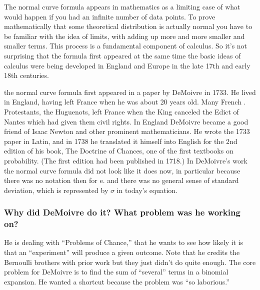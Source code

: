 \documentclass{article}
\begin{document}
The normal curve formula appears in mathematics as a limiting case of what would happen if you had an
infinite number of data points. To prove mathematically that some theoretical distribution is actually
normal you have to be familiar with the idea of limits, with adding up more and more smaller and smaller
terms. This process is a fundamental component of calculus. So it’s not surprising that the formula first
appeared at the same time the basic ideas of calculus were being developed in England and Europe in the
late 17th and early 18th centuries.

the normal curve formula first appeared in a paper by DeMoivre in 1733. He lived in
England, having left France when he was about 20 years old. Many French .
Protestants, the Huguenots, left France when the King canceled the Edict of Nantes
which had given them civil rights. In England DeMoivre became a good friend of
Isaac Newton and other prominent mathematicians.
He wrote the 1733 paper in Latin, and in 1738 he translated it himself into English for
the 2nd edition of his book, The Doctrine of Chances, one of the first textbooks on
probability. (The first edition had been published in 1718.)
In DeMoivre’s work the normal curve formula did not look like it does now, in particular because there
was no notation then for e. and there was no general sense of standard deviation, which is represented by $ \sigma $ in today’s equation.

\subsubsection{Why did DeMoivre do it? What problem was he working on?}

He is dealing with “Problems of Chance,” that he wants to see how likely it is that an “experiment” will produce a given
outcome.
Note that he credits the Bernoulli brothers with prior work but they just didn’t do quite enough.
The core problem for DeMoivre is to find the sum of “several” terms in a binomial expansion. He wanted a
shortcut because the problem was “so laborious.”
\end{document}
